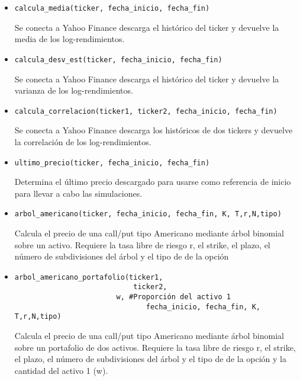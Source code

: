 \documentclass[11pt]{article}
\begin{document}
\begin{itemize}

\item \begin{verbatim}
calcula_media(ticker, fecha_inicio, fecha_fin)
\end{verbatim}
Se conecta a Yahoo Finance descarga el histórico del ticker y devuelve la media de los log-rendimientos.

\item \begin{verbatim}
calcula_desv_est(ticker, fecha_inicio, fecha_fin)
\end{verbatim}
Se conecta a Yahoo Finance descarga el histórico del ticker y devuelve la varianza de los log-rendimientos.

\item \begin{verbatim}
calcula_correlacion(ticker1, ticker2, fecha_inicio, fecha_fin)
\end{verbatim}
Se conecta a Yahoo Finance descarga los históricos de dos tickers y devuelve la correlación de los log-rendimientos.

\item \begin{verbatim}
ultimo_precio(ticker, fecha_inicio, fecha_fin)
\end{verbatim}
Determina el último precio descargado para usarse como referencia de inicio para llevar a cabo las simulaciones.

\item \begin{verbatim}
arbol_americano(ticker, fecha_inicio, fecha_fin, K, T,r,N,tipo)
\end{verbatim}
Calcula el precio de una call/put tipo Americano mediante árbol binomial sobre un activo.
Requiere la tasa libre de riesgo r, el strike, el plazo, el número de subdivisiones del árbol y el tipo de de la opción

\item \begin{verbatim}
arbol_americano_portafolio(ticker1,
                            ticker2,
                        w, #Proporción del activo 1
                               fecha_inicio, fecha_fin, K, T,r,N,tipo)
\end{verbatim}
Calcula el precio de una call/put tipo Americano mediante árbol binomial sobre un portafolio de dos activos. Requiere la tasa libre de riesgo r, el strike, el plazo, el número de subdivisiones del árbol y el tipo de de la opción y la cantidad del activo 1 (w).


\end{itemize}
\end{document}
